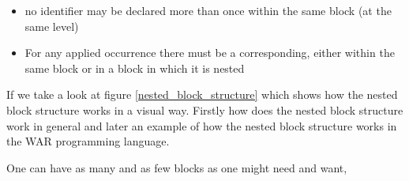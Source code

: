 	\begin{itemize}
	\item no identifier may be declared more than once within the same block (at the same level) %
	\item For any applied occurrence there must be a corresponding, either within the same block or in a block in which it is nested %
	\end{itemize}
	
	
	If we take a look at figure \ref{nested_block_structure} which shows how the nested block structure works in a visual way. Firstly how does the nested block structure work in general and later an example of how the nested block structure works in the WAR programming language.
	
	One can have as many and as few blocks as one might need and want, 
	 
	
	

	

	
	
	
	
	
	
	
	
	
	
	
	
	
